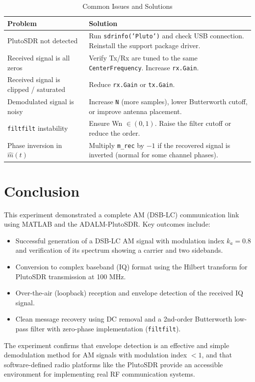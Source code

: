 \documentclass[12pt,a4paper]{article}
\begin{document}
\begin{table}[H]
  \centering
  \caption{Common Issues and Solutions}
  \begin{tabular}{p{4.5cm} p{8.5cm}}
    \toprule
    \textbf{Problem} & \textbf{Solution} \\
    \midrule
    PlutoSDR not detected &
      Run \texttt{sdrinfo('Pluto')} and check USB connection.
      Reinstall the support package driver. \\[4pt]
    Received signal is all zeros &
      Verify Tx/Rx are tuned to the same \texttt{CenterFrequency}.
      Increase \texttt{rx.Gain}. \\[4pt]
    Received signal is clipped / saturated &
      Reduce \texttt{rx.Gain} or \texttt{tx.Gain}. \\[4pt]
    Demodulated signal is noisy &
      Increase \texttt{N} (more samples), lower Butterworth cutoff, or
      improve antenna placement. \\[4pt]
    \texttt{filtfilt} instability & 
      Ensure Wn $\in (0,1)$. Raise the filter cutoff or reduce the order. \\[4pt]
    Phase inversion in $\hat{m}(t)$ &
      Multiply \texttt{m\_rec} by $-1$ if the recovered signal is inverted
      (normal for some channel phases). \\
    \bottomrule
  \end{tabular}
\end{table}

\section{Conclusion}

This experiment demonstrated a complete AM (DSB-LC) communication link using
MATLAB and the ADALM-PlutoSDR.  Key outcomes include:

\begin{itemize}
  \item Successful generation of a DSB-LC AM signal with modulation index
        $k_a = 0.8$ and verification of its spectrum showing a carrier and two
        sidebands.
  \item Conversion to complex baseband (IQ) format using the Hilbert transform
        for PlutoSDR transmission at 100 MHz.
  \item Over-the-air (loopback) reception and envelope detection
        of the received IQ signal.
  \item Clean message recovery using DC removal and a 2nd-order Butterworth
        low-pass filter with zero-phase implementation (\texttt{filtfilt}).
\end{itemize}

The experiment confirms that envelope detection is an effective and simple
demodulation method for AM signals with modulation index $< 1$, and that
software-defined radio platforms like the PlutoSDR provide an accessible
environment for implementing real RF communication systems.

\end{document}
